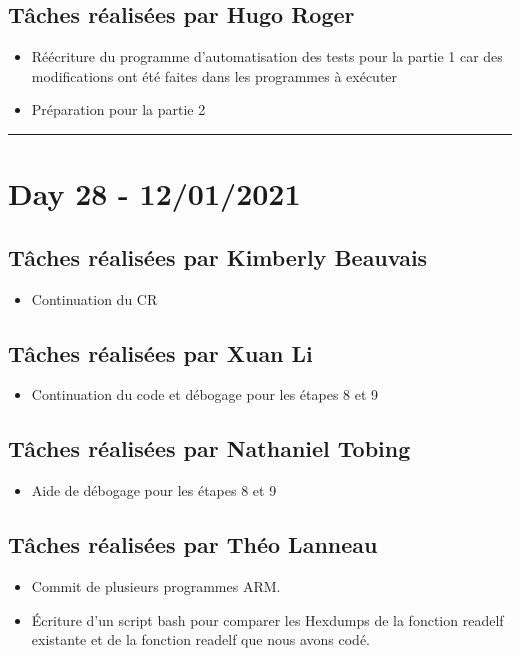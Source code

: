 \documentclass[11pt,letterpaper]{article}
\begin{document}
\subsection*{Tâches réalisées par Hugo Roger}
\begin{itemize}
    \item Réécriture du programme d’automatisation des tests pour la partie 1 
    car des modifications ont été faites dans les programmes à exécuter
    \item Préparation pour la partie 2
\end{itemize}

\noindent\rule{13cm}{0.4pt}

\section*{Day 28 - 12/01/2021}

\subsection*{Tâches réalisées par Kimberly Beauvais}
\begin{itemize}
    \item Continuation du CR
\end{itemize}

\subsection*{Tâches réalisées par Xuan Li}
\begin{itemize}
    \item Continuation du code et débogage pour les étapes 8 et 9
\end{itemize}

\subsection*{Tâches réalisées par Nathaniel Tobing}
\begin{itemize}
    \item Aide de débogage pour les étapes 8 et 9
\end{itemize}

\subsection*{Tâches réalisées par Théo Lanneau}
\begin{itemize}
    \item Commit de plusieurs programmes ARM. 
    \item Écriture d’un script bash pour comparer les Hexdumps de la fonction 
    readelf existante et de la fonction readelf que nous avons codé.
\end{itemize}
\end{document}
